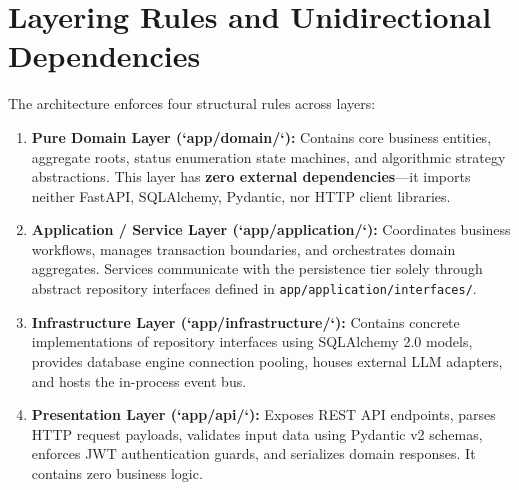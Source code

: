 \documentclass[11pt,a4paper,oneside]{report}
\begin{document}
\section{Layering Rules and Unidirectional Dependencies}
\label{sec:arch_rules}
The architecture enforces four structural rules across layers:
\begin{enumerate}
    \item \textbf{Pure Domain Layer (`app/domain/`):} Contains core business entities, aggregate roots, status enumeration state machines, and algorithmic strategy abstractions. This layer has \textbf{zero external dependencies}---it imports neither FastAPI, SQLAlchemy, Pydantic, nor HTTP client libraries.
    \item \textbf{Application / Service Layer (`app/application/`):} Coordinates business workflows, manages transaction boundaries, and orchestrates domain aggregates. Services communicate with the persistence tier solely through abstract repository interfaces defined in \texttt{app/application/interfaces/}.
    \item \textbf{Infrastructure Layer (`app/infrastructure/`):} Contains concrete implementations of repository interfaces using SQLAlchemy 2.0 models, provides database engine connection pooling, houses external LLM adapters, and hosts the in-process event bus.
    \item \textbf{Presentation Layer (`app/api/`):} Exposes REST API endpoints, parses HTTP request payloads, validates input data using Pydantic v2 schemas, enforces JWT authentication guards, and serializes domain responses. It contains zero business logic.
\end{enumerate}
\end{document}
